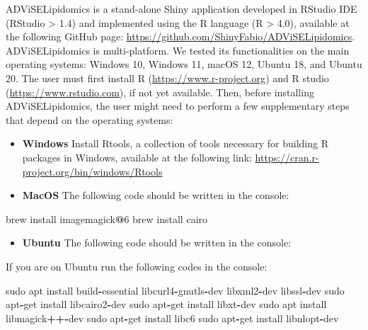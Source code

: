\documentclass[
]{book}
\newenvironment{Shaded}{\begin{snugshade}}{\end{snugshade}}
\newcommand{\DecValTok}[1]{\textcolor[rgb]{0.00,0.00,0.81}{#1}}
\newcommand{\NormalTok}[1]{#1}
\newcommand{\SpecialCharTok}[1]{\textcolor[rgb]{0.81,0.36,0.00}{\textbf{#1}}}
\providecommand{\tightlist}{%
  \setlength{\itemsep}{0pt}\setlength{\parskip}{0pt}}
\begin{document}
ADViSELipidomics is a stand-alone Shiny application developed in RStudio IDE (RStudio \textgreater{} 1.4) and implemented using the R language (R \textgreater{} 4.0), available at the following GitHub page: \url{https://github.com/ShinyFabio/ADViSELipidomics}. ADViSELipidomics is multi-platform. We tested its functionalities on the main operating systems: Windows 10, Windows 11, macOS 12, Ubuntu 18, and Ubuntu 20.
The user must first install R (\url{https://www.r-project.org}) and R studio (\url{https://www.rstudio.com}), if not yet available. Then, before installing ADViSELipidomics, the user might need to perform a few supplementary steps that depend on the operating systems:

\begin{itemize}
\item
  \textbf{Windows} Install Rtools, a collection of tools necessary for building R packages in Windows, available at the following link: \url{https://cran.r-project.org/bin/windows/Rtools}
\item
  \textbf{MacOS} The following code should be written in the console:
\end{itemize}

\begin{Shaded}
\begin{Highlighting}[]
\NormalTok{brew install imagemagick}\SpecialCharTok{@}\DecValTok{6}
\NormalTok{brew install cairo}
\end{Highlighting}
\end{Shaded}

\begin{itemize}
\tightlist
\item
  \textbf{Ubuntu} The following code should be written in the console:
\end{itemize}

If you are on Ubuntu run the following codes in the console:

\begin{Shaded}
\begin{Highlighting}[]
\NormalTok{sudo apt install build}\SpecialCharTok{{-}}\NormalTok{essential libcurl4}\SpecialCharTok{{-}}\NormalTok{gnutls}\SpecialCharTok{{-}}\NormalTok{dev libxml2}\SpecialCharTok{{-}}\NormalTok{dev libssl}\SpecialCharTok{{-}}\NormalTok{dev}
\NormalTok{sudo apt}\SpecialCharTok{{-}}\NormalTok{get install libcairo2}\SpecialCharTok{{-}}\NormalTok{dev}
\NormalTok{sudo apt}\SpecialCharTok{{-}}\NormalTok{get install libxt}\SpecialCharTok{{-}}\NormalTok{dev}
\NormalTok{sudo apt install libmagick}\SpecialCharTok{++{-}}\NormalTok{dev}
\NormalTok{sudo apt}\SpecialCharTok{{-}}\NormalTok{get install libc6}
\NormalTok{sudo apt}\SpecialCharTok{{-}}\NormalTok{get install libnlopt}\SpecialCharTok{{-}}\NormalTok{dev}
\end{Highlighting}
\end{Shaded}
\end{document}

